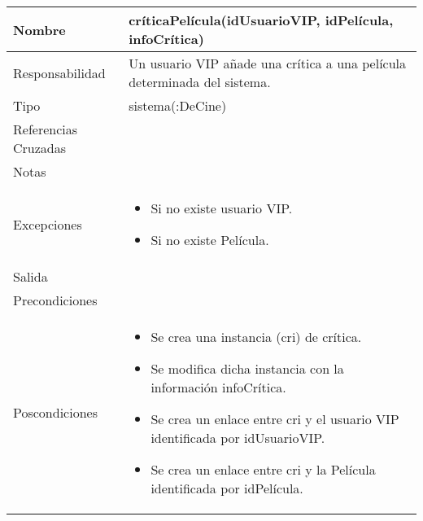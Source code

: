 \documentclass{article}
\begin{document}
\begin{table}[h]
\begin{tabular}{|l|l|l|l|l|l|}
\hline
\multicolumn{2}{|p{3cm}|}{Nombre} & \multicolumn{4}{p{10cm}|}{\textbf{críticaPelícula(idUsuarioVIP, idPelícula, infoCrítica)}}\\
\hline
\multicolumn{2}{|p{3cm}|}{Responsabilidad} & \multicolumn{4}{p{10cm}|}{Un usuario VIP añade una crítica a una película determinada del sistema.} \\
\hline
\multicolumn{2}{|p{3cm}|}{Tipo} & \multicolumn{4}{p{10cm}|}{sistema(:DeCine)} \\
\hline
\multicolumn{2}{|p{3cm}|}{Referencias Cruzadas} & \multicolumn{4}{p{10cm}|}{} \\
\hline
\multicolumn{2}{|p{3cm}|}{Notas} & \multicolumn{4}{p{10cm}|}{} \\
\hline
\multicolumn{2}{|p{3cm}|}{Excepciones} & \multicolumn{4}{p{10cm}|}{\begin{itemize}
\item Si no existe usuario VIP.
\item Si no existe Película.
\end{itemize}} \\
\hline
\multicolumn{2}{|p{3cm}|}{Salida} & \multicolumn{4}{p{10cm}|}{} \\
\hline
\multicolumn{2}{|p{3cm}|}{Precondiciones} & \multicolumn{4}{p{10cm}|}{} \\
\hline
\multicolumn{2}{|p{3cm}|}{Poscondiciones} & \multicolumn{4}{p{10cm}|}{\begin{itemize}
\item Se crea una instancia (cri) de crítica.
\item Se modifica dicha instancia con la información infoCrítica.
\item Se crea un enlace entre cri y el usuario VIP identificada por idUsuarioVIP.
\item Se crea un enlace entre cri y la Película identificada por idPelícula.
\end{itemize}} \\
\hline
\end{tabular}
\end{table}
\end{document}
